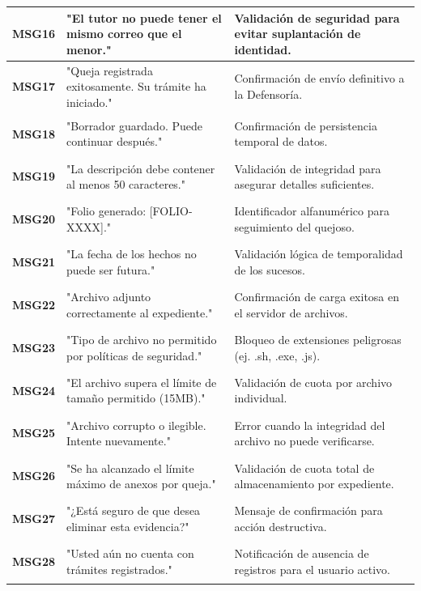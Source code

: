 \begin{longtable}{|p{2cm}|p{6cm}|p{6cm}|}
    \hypertarget{msg:MSG16}{\textbf{MSG16}} & "El tutor no puede tener el mismo correo que el menor." & Validación de seguridad para evitar suplantación de identidad. \\ \hline
    \hypertarget{msg:MSG17}{\textbf{MSG17}} & "Queja registrada exitosamente. Su trámite ha iniciado." & Confirmación de envío definitivo a la Defensoría. \\ \hline
    \hypertarget{msg:MSG18}{\textbf{MSG18}} & "Borrador guardado. Puede continuar después." & Confirmación de persistencia temporal de datos. \\ \hline
    \hypertarget{msg:MSG19}{\textbf{MSG19}} & "La descripción debe contener al menos 50 caracteres." & Validación de integridad para asegurar detalles suficientes. \\ \hline
    \hypertarget{msg:MSG20}{\textbf{MSG20}} & "Folio generado: [FOLIO-XXXX]." & Identificador alfanumérico para seguimiento del quejoso. \\ \hline
    \hypertarget{msg:MSG21}{\textbf{MSG21}} & "La fecha de los hechos no puede ser futura." & Validación lógica de temporalidad de los sucesos. \\ \hline
    \hypertarget{msg:MSG22}{\textbf{MSG22}} & "Archivo adjunto correctamente al expediente." & Confirmación de carga exitosa en el servidor de archivos. \\ \hline
    \hypertarget{msg:MSG23}{\textbf{MSG23}} & "Tipo de archivo no permitido por políticas de seguridad." & Bloqueo de extensiones peligrosas (ej. .sh, .exe, .js). \\ \hline
    \hypertarget{msg:MSG24}{\textbf{MSG24}} & "El archivo supera el límite de tamaño permitido (15MB)." & Validación de cuota por archivo individual. \\ \hline
    \hypertarget{msg:MSG25}{\textbf{MSG25}} & "Archivo corrupto o ilegible. Intente nuevamente." & Error cuando la integridad del archivo no puede verificarse. \\ \hline
    \hypertarget{msg:MSG26}{\textbf{MSG26}} & "Se ha alcanzado el límite máximo de anexos por queja." & Validación de cuota total de almacenamiento por expediente. \\ \hline
    \hypertarget{msg:MSG27}{\textbf{MSG27}} & "¿Está seguro de que desea eliminar esta evidencia?" & Mensaje de confirmación para acción destructiva. \\ \hline
    \hypertarget{msg:MSG28}{\textbf{MSG28}} & "Usted aún no cuenta con trámites registrados." & Notificación de ausencia de registros para el usuario activo. \\ \hline

\end{longtable}
